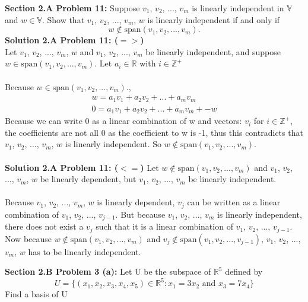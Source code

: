 \documentclass[12pt]{article}
\begin{document}
\noindent \textbf{Section 2.A Problem 11: } Suppose $v_1$, $v_2$, ..., $v_m$ is linearly independent in $\mathbb{V}$ and $w \in \mathbb{V}$. Show that $v_1$, $v_2$, ..., $v_m$, $w$ is linearly independent if and only if $$w \not \in \text{span} (v_1, v_2, ..., v_m).$$
\noindent \textbf{Solution 2.A Problem 11: ($=>$) } \\ Let $v_1$, $v_2$, ..., $v_m$, $w$ and $v_1$, $v_2$, ..., $v_m$ be linearly independent, and suppose $w\in \text{span} (v_1, v_2, ..., v_m).$ Let $a_i \in \mathbb{R}$ with $i \in \mathbb{Z}^+$ 
\\\\
Because $w\in \text{span} (v_1, v_2, ..., v_m).$, 
	\begin{align}
		w = a_1v_1 + a_2v_2 + ... + a_mv_m \\
		0 = a_1v_1 + a_2v_2 + ... + a_mv_m + -w
	\end{align}
Because we can write 0 as a linear combination of w and vectors: $v_i$ for $i \in \mathbb{Z}^+$, the coefficients are not all 0 as the coefficient to w is -1, thus this contradicts that $v_1$, $v_2$, ..., $v_m$, $w$ is linearly independent. So $w \not \in \text{span} (v_1, v_2, ..., v_m).$  
\\\\
\noindent \textbf{Solution 2.A Problem 11: ($<=$) } Let $w \not \in \text{span} (v_1, v_2, ..., v_m)$ and $v_1$, $v_2$, ..., $v_m$, $w$ be linearly dependent, but $v_1$, $v_2$, ..., $v_m$ be linearly independent. 
\\\\
Because $v_1$, $v_2$, ..., $v_m$, $w$ is linearly dependent, $v_j$ can be written as a linear combination of $v_1$, $v_2$, ..., $v_{j-1}$.  But because $v_1$, $v_2$, ..., $v_m$ is linearly independent, there does not exist a $v_j$ such that it is a linear combination of $v_1$, $v_2$, ..., $v_{j-1}$.  Now because $w \not \in \text{span} (v_1, v_2, ..., v_m)$ and $v_j \not \in \text{span} (v_1, v_2, ..., v_{j-1})$, $v_1$, $v_2$, ..., $v_m$, $w$ has to be linearly independent.

\newpage

\noindent \textbf{Section 2.B Problem 3 (a): } Let U be the subspace of $\mathbb{R}^5$ defined by $$U = \{ (x_1,x_2,x_3,x_4,x_5) \in \mathbb{R}^5: x_1 = 3x_2 \text{ and } x_3 = 7x_4\}$$ Find a basis of U \\
\end{document}
